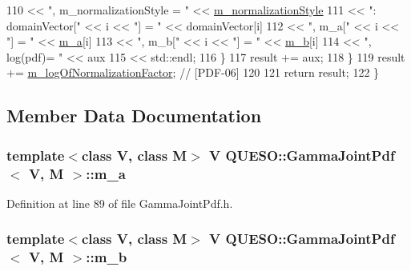 \begin{DoxyCode}
110                               << \textcolor{stringliteral}{", m\_normalizationStyle = "}      << 
      \hyperlink{class_q_u_e_s_o_1_1_base_joint_pdf_a138c99bcef7a67077d9612bddfdcb896}{m\_normalizationStyle}
111                               << \textcolor{stringliteral}{": domainVector["} << i << \textcolor{stringliteral}{"] = "} << domainVector[i]
112                               << \textcolor{stringliteral}{", m\_a["} << i << \textcolor{stringliteral}{"] = "}          << \hyperlink{class_q_u_e_s_o_1_1_gamma_joint_pdf_ab7120940a19b96f70ffde24ddc22cf20}{m\_a}[i]
113                               << \textcolor{stringliteral}{", m\_b["} << i << \textcolor{stringliteral}{"] = "}          << \hyperlink{class_q_u_e_s_o_1_1_gamma_joint_pdf_ad651745cadab6db31b6458ad8f72c570}{m\_b}[i]
114                               << \textcolor{stringliteral}{", log(pdf)= "}                   << aux
115                               << std::endl;
116     \}
117     result += aux;
118   \}
119   result += \hyperlink{class_q_u_e_s_o_1_1_base_joint_pdf_ae82d4191f17af8c7a26226d127bc7850}{m\_logOfNormalizationFactor}; \textcolor{comment}{// [PDF-06]}
120 
121   \textcolor{keywordflow}{return} result;
122 \}
\end{DoxyCode}


\subsection{Member Data Documentation}
\hypertarget{class_q_u_e_s_o_1_1_gamma_joint_pdf_ab7120940a19b96f70ffde24ddc22cf20}{
\subsubsection[{m\-\_\-a}]{\setlength{\rightskip}{0pt plus 5cm}template$<$class V, class M$>$ V {\bf Q\-U\-E\-S\-O\-::\-Gamma\-Joint\-Pdf}$<$ V, M $>$\-::m\-\_\-a\hspace{0.3cm}{\ttfamily [protected]}}}\label{class_q_u_e_s_o_1_1_gamma_joint_pdf_ab7120940a19b96f70ffde24ddc22cf20}


Definition at line 89 of file Gamma\-Joint\-Pdf.\-h.

\hypertarget{class_q_u_e_s_o_1_1_gamma_joint_pdf_ad651745cadab6db31b6458ad8f72c570}{
\subsubsection[{m\-\_\-b}]{\setlength{\rightskip}{0pt plus 5cm}template$<$class V, class M$>$ V {\bf Q\-U\-E\-S\-O\-::\-Gamma\-Joint\-Pdf}$<$ V, M $>$\-::m\-\_\-b\hspace{0.3cm}{\ttfamily [protected]}}}\label{class_q_u_e_s_o_1_1_gamma_joint_pdf_ad651745cadab6db31b6458ad8f72c570}


